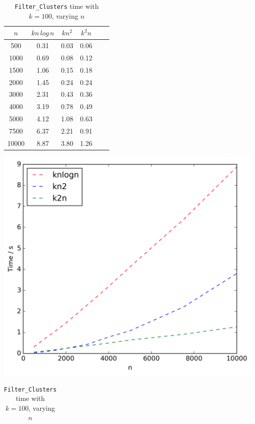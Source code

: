 \documentclass{article}
\begin{document}
\begin{table}[!ht]
\begin{minipage}{0.48\textwidth}
            \centering
            \caption{Weighting time with $k = 100$, varying $n$}
            \label{tab:weightn}
            \begin{tabular}{c||ccccc}
                $n$ & $kn\,log\,n$ & $kn^2$ & $k^2n$\\
                \hline\hline
                500 & 0.31 & 0.03 & 0.06\\
                1000 & 0.69 & 0.08 & 0.12\\
                1500 & 1.06 & 0.15 & 0.18\\
                2000 & 1.45 & 0.24 & 0.24\\
                3000 & 2.31 & 0.43 & 0.36\\
                4000 & 3.19 & 0.78 & 0.49\\
                5000 & 4.12 & 1.08 & 0.63\\
                7500 & 6.37 & 2.21 & 0.91\\
                10000 & 8.87 & 3.80 & 1.26\\
            \end{tabular}
            \includegraphics[scale=0.4]{varyingn1_weighting}
        \end{minipage}\hfill
        \begin{minipage}{0.48\textwidth}
            \centering
            \caption{\texttt{Filter\_Clusters} time with $k = 100$, varying $n$}
            \label{tab:filtern}
            \begin{tabular}{c||ccccc}

\end{tabular}
\end{minipage}
\end{table}
\end{document}
